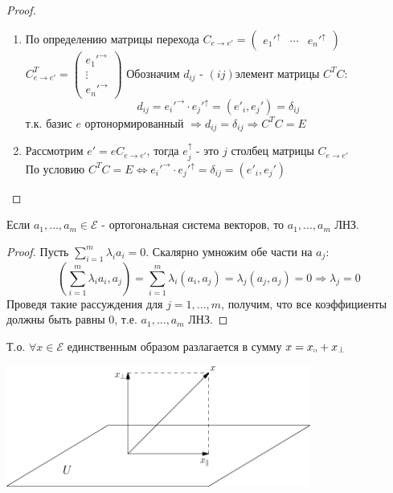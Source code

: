 \begin{proof} \tab
    \begin{enumerate}
        \item По определению матрицы перехода $C_{e \to e'} = \begin{pmatrix}
            e_1'^{\uparrow} & \cdots & e_n'^{\uparrow}
        \end{pmatrix}$\\
        $C^T_{e\to e'} = \begin{pmatrix}
            e_1'^{\rightarrow}  \\ \vdots \\ e_n'^{\rightarrow} 
        \end{pmatrix}$ Обозначим $d_{ij}$ - $(ij)$элемент матрицы $C^TC:$ 
        $$d_{ij} = e_i'^{\rightarrow} \cdot e_j'^{\uparrow} = (e'_i,e_j') = \delta_{ij}$$
        т.к. базис $e$ ортонормированный $\Longrightarrow d_{ij} = \delta_{ij} \Longrightarrow C^TC = E$
        \item Рассмотрим $e' = eC_{e\to e'}$, тогда $e_j^{\uparrow}$ - это $j$ столбец матрицы $C_{e\to e'}$\\
        По условию $C^TC = E \Longleftrightarrow e_i'^{\rightarrow} \cdot e_j'^{\uparrow} = \delta_{ij} = (e'_i,e_j')$
    \end{enumerate}    
\end{proof}
\begin{lemma}
    Если $a_1,...,a_m \in \mathcal{E}$ - ортогональная система векторов, то $a_1,...,a_m$ ЛНЗ. 
\end{lemma}
\begin{proof}
    Пусть $\sum \limits_{i=1}^m \lambda_ia_i = 0$. Скалярно умножим обе части на $a_j$:
    \[(\sum \limits_{i=1}^m \lambda_ia_i, a_j) = \sum \limits_{i=1}^m \lambda_i(a_i, a_j) = \lambda_j(a_j, a_j) = 0 \Longrightarrow \lambda_j = 0\]
    Проведя такие рассуждения для $j = 1,...,m$, получим, что все коэффициенты должны быть равны 0, т.е. $a_1,...,a_m$ ЛНЗ.
\end{proof}
Т.о. $\forall x \in \mathcal{E}$ единственным образом разлагается в сумму $x = x_{\shortparallel} + x_{\perp}$
\begin{center}
    \includegraphics[width=10cm]{image/Asymptote/3/linal-3-1.pdf}
\end{center}
